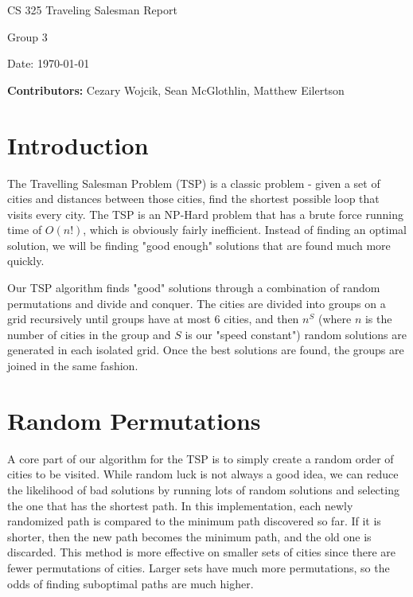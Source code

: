 \documentclass[12pt,letterpaper]{article}
\begin{document}
\begin{titlepage}
    \vspace*{4cm}
    {\huge \center
        CS 325 Traveling Salesman Report\\[1cm]
    }
    \center
    {\large
        Group 3

        Date: \today

    \textbf{Contributors:}
    Cezary Wojcik,
    Sean McGlothlin,
    Matthew Eilertson
    }

\end{titlepage}

\section*{Introduction}

The Travelling Salesman Problem (TSP) is a classic problem - given a set of cities and distances between those cities, find the shortest possible loop that visits every city. The TSP is an NP-Hard problem that has a brute force running time of $O(n!)$, which is obviously fairly inefficient. Instead of finding an optimal solution, we will be finding "good enough" solutions that are found much more quickly.

Our TSP algorithm finds "good" solutions through a combination of random permutations and divide and conquer. The cities are divided into groups on a grid recursively until groups have at most 6 cities, and then $n^S$ (where $n$ is the number of cities in the group and $S$ is our "speed constant") random solutions are generated in each isolated grid. Once the best solutions are found, the groups are joined in the same fashion.

\section*{Random Permutations}

A core part of our algorithm for the TSP is to simply create a random order of cities to be visited. While random luck is not always a good idea, we can reduce the likelihood of bad solutions by running lots of random solutions and selecting the one that has the shortest path. In this implementation, each newly randomized path is compared to the minimum path discovered so far. If it is shorter, then the new path becomes the minimum path, and the old one is discarded. This method is more effective on smaller sets of cities since there are fewer permutations of cities. Larger sets have much more permutations, so the odds of finding suboptimal paths are much higher.
\end{document}
